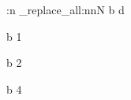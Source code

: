 \documentclass[12pt]{article}
\begin{document}
\ExplSyntaxOn
\rewriterest:n {
	\regex_replace_all:nnN {b} {d} \RWRbody
}
\ExplSyntaxOff

b 1 \par
b 2 \par
b 4
\end{document}
